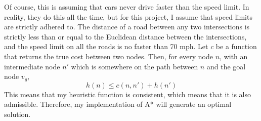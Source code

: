\documentclass[conference]{IEEEtran}
\begin{document}
Of course, this is assuming that cars never drive faster than the speed limit. In reality, they do this all the time, but for this project, I assume that speed limits are strictly adhered to.
\newline
\newline
The distance of a road between any two intersections is strictly less than or equal to the Euclidean distance between the intersections, and the speed limit on all the roads is no faster than 70 mph. Let $c$ be a function that returns the true cost between two nodes. Then, for every node $n$, with an intermediate node $n'$ which is somewhere on the path between $n$ and the goal node $v_g$, \[h(n) \leq c(n, n') + h(n')\] 
This means that my heuristic function is consistent, which means that it is also admissible. Therefore, my implementation of A* will generate an optimal solution.
\end{document}
